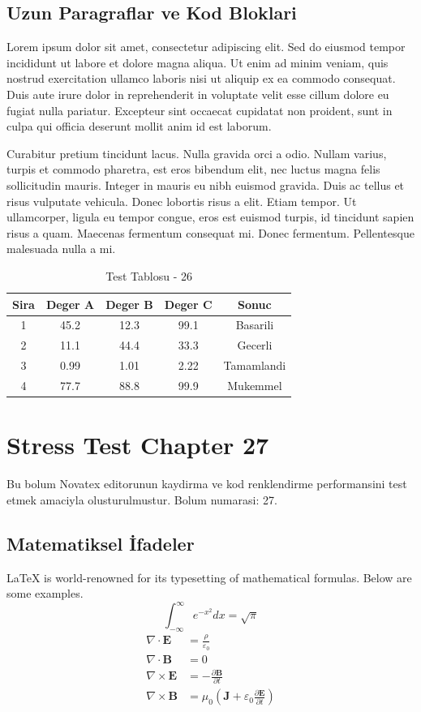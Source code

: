 \documentclass[12pt,a4paper]{article}
\begin{document}
\subsection{Uzun Paragraflar ve Kod Bloklari}
Lorem ipsum dolor sit amet, consectetur adipiscing elit. Sed do eiusmod tempor incididunt ut labore et dolore magna aliqua. Ut enim ad minim veniam, quis nostrud exercitation ullamco laboris nisi ut aliquip ex ea commodo consequat. Duis aute irure dolor in reprehenderit in voluptate velit esse cillum dolore eu fugiat nulla pariatur. Excepteur sint occaecat cupidatat non proident, sunt in culpa qui officia deserunt mollit anim id est laborum.

Curabitur pretium tincidunt lacus. Nulla gravida orci a odio. Nullam varius, turpis et commodo pharetra, est eros bibendum elit, nec luctus magna felis sollicitudin mauris. Integer in mauris eu nibh euismod gravida. Duis ac tellus et risus vulputate vehicula. Donec lobortis risus a elit. Etiam tempor. Ut ullamcorper, ligula eu tempor congue, eros est euismod turpis, id tincidunt sapien risus a quam. Maecenas fermentum consequat mi. Donec fermentum. Pellentesque malesuada nulla a mi.

\begin{table}[h!]
\centering
\begin{tabular}{|c|c|c|c|c|}
\hline
\textbf{Sira} & \textbf{Deger A} & \textbf{Deger B} & \textbf{Deger C} & \textbf{Sonuc} \\
\hline
1 & 45.2 & 12.3 & 99.1 & Basarili \\
2 & 11.1 & 44.4 & 33.3 & Gecerli \\
3 & 0.99 & 1.01 & 2.22 & Tamamlandi \\
4 & 77.7 & 88.8 & 99.9 & Mukemmel \\
\hline
\end{tabular}
\caption{Test Tablosu - 26}
\end{table}

\newpage
\section{Stress Test Chapter 27}
Bu bolum Novatex editorunun kaydirma ve kod renklendirme performansini test etmek amaciyla olusturulmustur. Bolum numarasi: 27.

\subsection{Matematiksel İfadeler}
\LaTeX{} is world-renowned for its typesetting of mathematical formulas. Below are some examples.
\begin{equation}
\int_{-\infty}^{\infty} e^{-x^2} dx = \sqrt{\pi}
\end{equation}
\begin{align}
\nabla \cdot \mathbf{E} &= \frac{\rho}{\varepsilon_0} \\
\nabla \cdot \mathbf{B} &= 0 \\
\nabla \times \mathbf{E} &= -\frac{\partial \mathbf{B}}{\partial t} \\
\nabla \times \mathbf{B} &= \mu_0\left(\mathbf{J} + \varepsilon_0 \frac{\partial \mathbf{E}}{\partial t}\right)
\end{align}
\end{document}

